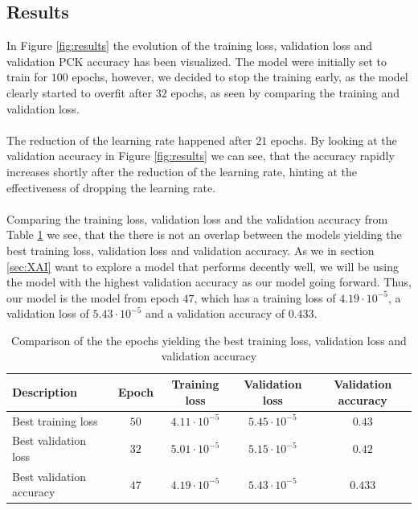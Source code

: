 \documentclass[./main.tex]{subfiles}
\begin{document}
\subsection{Results}\label{subsec:results}
In Figure \ref{fig:results} the evolution of the training loss, validation loss and validation PCK accuracy has been visualized. The model were initially set to train for $100$ epochs, however, we decided to stop the training early, as the model clearly started to overfit after $32$ epochs, as seen by comparing the training and validation loss.
\\
\\
The reduction of the learning rate happened after $21$ epochs. By looking at the validation accuracy in Figure \ref{fig:results} we can see, that the accuracy rapidly increases shortly after the reduction of the learning rate, hinting at the effectiveness of dropping the learning rate. 
\\
\\
Comparing the training loss, validation loss and the validation accuracy from Table \ref{tab:results} we see, that the there is not an overlap between the models yielding the best training loss, validation loss and validation accuracy. As we in section \ref{sec:XAI} want to explore a model that performs decently well, we will be using the model with the highest validation accuracy as our model going forward. Thus, our model is the model from epoch $47$, which has a training loss of $4.19 \cdot 10^{-5}$, a validation loss of $5.43 \cdot 10^{-5}$ and a validation accuracy of $0.433$.
\begin{table}[b]
    \centering
    \begin{tabular}{|l|c|c|c|c|}
        \hline
        \textbf{Description} & \textbf{Epoch} & \textbf{Training loss} & \textbf{Validation loss} & \textbf{Validation accuracy} \\
        \hline
        Best training loss & $50$ & $4.11 \cdot 10^{-5}$ & $5.45 \cdot 10^{-5}$ & $0.43$ \\
        \hline
        Best validation loss & $32$ & $5.01 \cdot 10^{-5}$ & $5.15 \cdot 10^{-5}$ & $0.42$ \\
        \hline
        Best validation accuracy & $47$ & $4.19 \cdot 10^{-5}$ & $5.43 \cdot 10^{-5}$  & $0.433$ \\
        \hline
    \end{tabular}
    \caption{Comparison of the the epochs yielding the best training loss, validation loss and validation accuracy}
    \label{tab:results}
\end{table}
\end{document}
